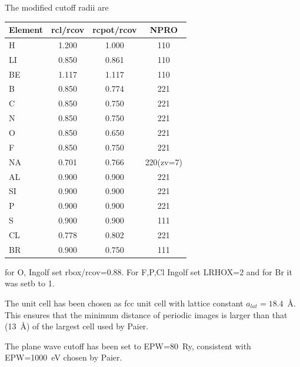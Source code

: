 \documentclass[11pt,a4paper]{report}
\begin{document}
The modified cutoff radii are
\begin{center}
\begin{tabular}{|l|c|c|c|}
\hline
Element  & rcl/rcov & rcpot/rcov & NPRO\\
\hline                            
H        &  1.200  &   1.000  &  110\\
LI       &  0.850  &   0.861  &  110\\
BE       &  1.117  &   1.117  &  110\\
B        &  0.850  &   0.774  &  221\\
C        &  0.850  &   0.750  &  221\\
N        &  0.850  &   0.750  &  221\\
O        &  0.850  &   0.650  &  221\\
F        &  0.850  &   0.750  &  221\\
NA       &  0.701  &   0.766  &  220(zv=7)\\
AL       &  0.900  &   0.900  &  221\\
SI       &  0.900  &   0.900  &  221\\
P        &  0.900  &   0.900  &  221\\
S        &  0.900  &   0.900  &  111\\
CL       &  0.778  &   0.802  &  221\\
BR       &  0.900  &   0.750  &  111\\
\hline
\end{tabular}
\end{center}
for O, Ingolf set rbox/rcov=0.88. For F,P,Cl Ingolf set LRHOX=2 and
for Br it was setb to 1.





 
The unit cell has been chosen as fcc unit cell with lattice constant
$a_{lat}=18.4$~{\AA}. This ensures that the minimum distance of periodic
images is larger than that (13~{\AA}) of the largest cell used by
Paier\cite{paier05_jcp122_23410}.

The plane wave cutoff has been set to EPW=80~Ry, consistent with
EPW=1000~eV chosen by Paier.
\end{document}
